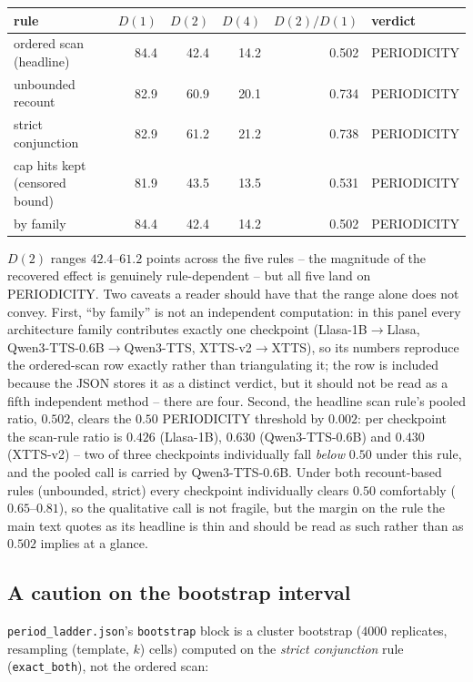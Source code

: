 \documentclass[11pt]{article}
\begin{document}
\begin{center}
\begin{tabular}{@{}lrrrrl@{}}
\toprule
rule & $D(1)$ & $D(2)$ & $D(4)$ & $D(2)/D(1)$ & verdict \\
\midrule
ordered scan (headline)     & 84.4 & 42.4 & 14.2 & 0.502 & PERIODICITY \\
unbounded recount           & 82.9 & 60.9 & 20.1 & 0.734 & PERIODICITY \\
strict conjunction          & 82.9 & 61.2 & 21.2 & 0.738 & PERIODICITY \\
cap hits kept (censored bound) & 81.9 & 43.5 & 13.5 & 0.531 & PERIODICITY \\
by family                   & 84.4 & 42.4 & 14.2 & 0.502 & PERIODICITY \\
\bottomrule
\end{tabular}
\end{center}

\noindent $D(2)$ ranges $42.4$--$61.2$ points across the five rules -- the
magnitude of the recovered effect is genuinely rule-dependent -- but all five
land on PERIODICITY. Two caveats a reader should have that the range alone
does not convey. First, ``by family'' is not an independent computation: in
this panel every architecture family contributes exactly one checkpoint
(Llasa-1B$\to$Llasa, Qwen3-TTS-0.6B$\to$Qwen3-TTS, XTTS-v2$\to$XTTS), so its
numbers reproduce the ordered-scan row exactly rather than triangulating it;
the row is included because the JSON stores it as a distinct verdict, but it
should not be read as a fifth independent method -- there are four. Second,
the headline scan rule's pooled ratio, $0.502$, clears the $0.50$
PERIODICITY threshold by $0.002$: per checkpoint the scan-rule ratio is
$0.426$ (Llasa-1B), $0.630$ (Qwen3-TTS-0.6B) and $0.430$ (XTTS-v2) -- two of
three checkpoints individually fall \emph{below} $0.50$ under this rule, and
the pooled call is carried by Qwen3-TTS-0.6B. Under both recount-based rules
(unbounded, strict) every checkpoint individually clears $0.50$
comfortably ($0.65$--$0.81$), so the qualitative call is not fragile, but the
margin on the rule the main text quotes as its headline is thin and should
be read as such rather than as $0.502$ implies at a glance.

\subsection{A caution on the bootstrap interval}

\texttt{period\_ladder.json}'s \texttt{bootstrap} block is a cluster
bootstrap ($4000$ replicates, resampling (template, $k$) cells) computed on
the \emph{strict conjunction} rule (\texttt{exact\_both}), not the ordered
scan:
\end{document}
